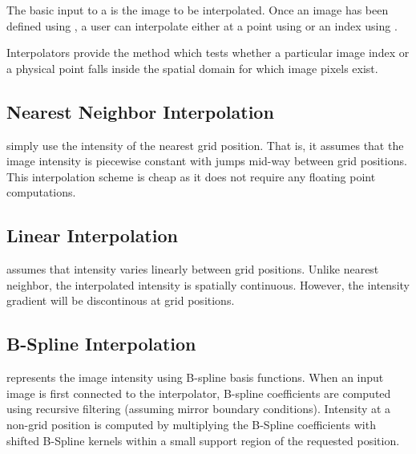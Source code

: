 
The basic input to a  is the image to
be interpolated. Once an image has been defined using ,
a user can interpolate either at a point using  or
an index using .
 
Interpolators provide the method  which tests whether a
particular image index or a physical point falls inside the spatial domain for
which image pixels exist.

\subsection{Nearest Neighbor Interpolation}
\label{sec:NearestNeighborInterpolation}
 simply use the intensity of
the nearest grid position. That is, it assumes that the image intensity
is piecewise constant with jumps mid-way between grid positions. 
This interpolation scheme is cheap as it does not require any 
floating point computations.

\subsection{Linear Interpolation}
\label{sec:LinearInterpolation}
 assumes that intensity varies linearly
between grid positions. Unlike nearest neighbor, the interpolated
intensity is spatially continuous. However, the intensity gradient
will be discontinous at grid positions.

\subsection{B-Spline Interpolation}
\label{sec:BSplineInterpolation}
 represents the image intensity 
using B-spline basis functions. When an input image is first 
connected to the interpolator, B-spline 
coefficients are computed using recursive filtering (assuming mirror
boundary conditions). Intensity at a non-grid position is computed
by multiplying the B-Spline coefficients with shifted B-Spline kernels
within a small support region of the requested position.

